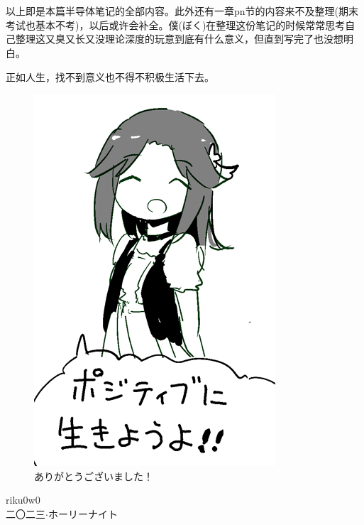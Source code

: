 \chapter*{ }

以上即是本篇半导体笔记的全部内容。此外还有一章pn节的内容来不及整理(期末考试也基本不考)，以后或许会补全。僕({\mincho ぼく})在整理这份笔记的时候常常思考自己整理这又臭又长又没理论深度的玩意到底有什么意义，但直到写完了也没想明白。

正如人生，找不到意义也不得不积极生活下去。

\begin{figure}
    \centering
    \includegraphics[width=0.7\linewidth]{teru2.png}
    \caption*{\mincho ありがとうございました！}
    \label{fig:teru2}
\end{figure}

\begin{flushright}
	riku0w0 \\
	\mincho 二〇二三$\cdot$ホーリーナイト\\
\end{flushright}



